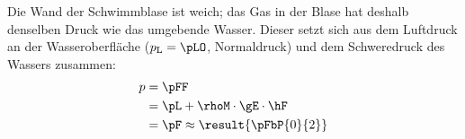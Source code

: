 Die Wand der Schwimmblase ist weich; das Gas in der Blase hat deshalb denselben Druck wie das umgebende Wasser. Dieser setzt sich aus dem Luftdruck an der Wasseroberfläche ($p_\text{L} = \pLO$, Normaldruck) und dem Schweredruck des Wassers zusammen:
\begin{align}
 p &= \pFF \\
   &= \pL + \rhoM\cdot\gE\cdot\hF \\
   &= \pF \approx \result{\pFbP{0}{2}}
\end{align}
